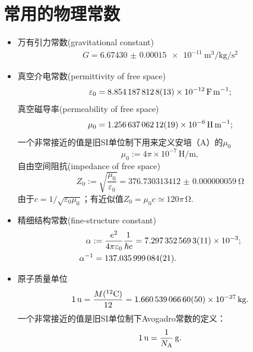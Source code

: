 \section{常用的物理常数}
\begin{itemize}
	\item 万有引力常数(gravitational constant)
		\begin{align}
			G = \qty{6.67430(15)e-11}{\metre\cubed\per\kilogram\per\second\squared}
		\end{align}

	\item 真空介电常数(permittivity of free space)
		\begin{align}
			\varepsilon_0 = \qty{8.8541878128(13)E-12}{\farad\per\metre};
		\end{align}
		真空磁导率(permeability of free space)
		\begin{align}
			\mu_0 = \qty{1.25663706212(19)E-6}{\henry\per\metre};
		\end{align}
		一个非常接近的值是旧SI单位制下用来定义安培（\unit{A}）的$\mu_0$
		\[
			\mu_0 := 4\pi \times 10^{-7}\,\unit{\henry\per\metre},
		\]
		自由空间阻抗(impedance of free space)
		\begin{equation}
			Z_0 := \sqrt{\frac{\mu_0}{\varepsilon_0}} = \qty{376.730313412(59)}{\ohm}
		\end{equation}
		由于$c = 1/\sqrt{\varepsilon_0\mu_0}$；有近似值$Z_0 = \mu_0c \simeq 120\pi\,\unit{\ohm}.$

	\item 精细结构常数(fine-structure constant)
		\begin{align}
			\alpha := {}&\frac{e^2}{4\pi\varepsilon_0}\frac1{\hbar c} = \num{7.2973525693(11)E-3};\\
			\alpha^{-1} = {}&\num{137.035999084(21)}.
		\end{align}

	\item 原子质量单位
		\begin{align}
			\qty{1}{u} = \frac{M(\nuclide{12}{C})}{12} = \qty{1.66053906660(50)E-27}{kg}.
		\end{align}
		一个非常接近的值是旧SI单位制下Avogadro常数的定义：
		\[
			\qty{1}{u} = \frac1{\NA}\,\unit{g}.
		\]


\end{itemize}
